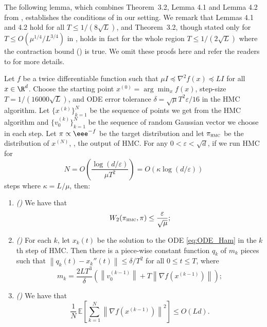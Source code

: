 \documentclass{toc}
\newcommand{\Exp}{\mathbb{E}}
\newcommand{\norm}[1]{\left\lVert #1 \right\rVert}
\newcommand{\grad}{\nabla}
\newcommand{\eps}{\varepsilon}
\begin{document}
The following lemma, which combines Theorem~3.2, Lemma 4.1 and Lemma 4.2 from \cite{LSV18}, establishes the conditions of  in our setting. We remark that Lemmas 4.1 and 4.2 hold for all $T \le 1/(8\sqrt{L})$, and Theorem~3.2, though stated only for $T \le O(\mu^{1/4}/L^{3/4})$ in \cite{LSV18}, holds in fact for the whole region $T \le 1/(2\sqrt{L})$ where the contraction bound () is true. We omit these proofs here and refer the readers to \cite{LSV18} for more details.

\begin{lemma}\label{lem:ODE_prep}
	Let $f$ be a twice differentiable function such that $\mu I \preceq \grad^2 f(x) \preceq LI$ for all $x\in \R^d$. Choose the starting point $x^{(0)} = \arg\min_x f(x)$, step-size $T = 1/(16000\sqrt{L})$, and ODE error tolerance $\delta = \sqrt{\mu}T^2 \eps/16$ in the HMC algorithm. Let $\{x^{(k)}\}_{k=1}^N$ be the sequence of points we get from the HMC algorithm and $\{v_0^{(k)}\}_{k=1}^N$ be the sequence of random Gaussian vector we choose in each step. Let $\pi \propto \eee^{-f}$ be the target distribution and let $\pi_{\textsc{hmc}}$ be the distribution of $x^{(N)}$, \ie, the output of HMC. For any $0<\eps<\sqrt{d}$, if we run HMC for 
	\begin{equation}
	N = O\left( \frac{\log(d/\eps)}{\mu T^2} \right) = O\left( \kappa \log(d/\eps) \right)
	\end{equation}
	steps where $\kappa = L/\mu$, then:
	\begin{enumerate}
		\item \emph{(\cite[Theorem 3.2]{LSV18})} We have that
		\begin{equation}
		W_2(\pi_{\textsc{hmc}},\pi) \le \frac{\eps}{\sqrt{\mu}};
		\end{equation}
		\item \emph{(\cite[Lemma 4.1]{LSV18})} For each $k$, let $x_k(t)$ be the solution to the ODE \eqref{eq:ODE_Ham} in the $k$th step of HMC. Then there is a piece-wise constant function $q_k$ of $m_k$ pieces such that $\norm{q_k(t)-x_k''(t)} \le \delta/T^2$ for all $0\le t\le T$, where
		\begin{equation}
		m_k = \frac{2LT^3}{\delta}\left( \norm{v_0^{(k-1)}} + T\norm{\grad f(x^{(k-1)})} \right);
		\end{equation}
		\item \emph{(\cite[Lemma 4.2]{LSV18})} We have that
		\begin{equation}
		\frac{1}{N}\, \Exp\left[ \sum_{k=1}^{N} \norm{\grad f(x^{(k-1)})}^2 \right] \le O(Ld).
		\end{equation}
	\end{enumerate}		
\end{lemma}
\end{document}
